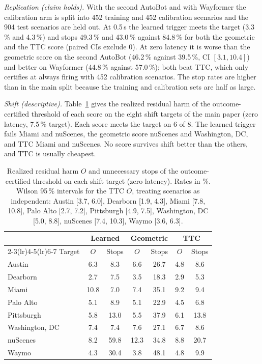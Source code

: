 \documentclass[lettersize,journal]{IEEEtran}
\begin{document}
\emph{Replication (claim holds).} With the second AutoBot and with Wayformer
the calibration arm is split into 452 training and 452 calibration scenarios
and the 904 test scenarios are held out. At 0.5\,s the learned trigger meets
the target (3.3\,\% and 4.3\,\%) and stops 49.3\,\% and 43.0\,\% against 84.8\,\%
for both the geometric and the TTC score (paired CIs exclude 0). At zero
latency it is worse than the geometric score on the second AutoBot (46.2\,\%
against 39.5\,\%, CI $[3.1, 10.4]$) and better on Wayformer (44.8\,\% against
57.0\,\%); both beat TTC, which only certifies at always firing with 452
calibration scenarios. The stop rates are higher than in the main split
because the training and calibration sets are half as large.

\emph{Shift (descriptive).} Table~\ref{tab:scoreshift} gives the realized
residual harm of the outcome-certified threshold of each score on the eight
shift targets of the main paper (zero latency, 7.5\,\% target). Each score
meets the target on 6 of 8. The learned trigger fails Miami and nuScenes, the
geometric score nuScenes and Washington, DC, and TTC Miami and nuScenes. No
score survives shift better than the others, and TTC is usually cheapest.

\begin{table}[h]
\caption{Realized residual harm $O$ and unnecessary stops of the
outcome-certified threshold on each shift target (zero latency). Rates in \%. Wilson 95\,\% intervals for the TTC $O$, treating scenarios as independent: Austin [3.7, 6.0], Dearborn [1.9, 4.3], Miami [7.8, 10.8], Palo Alto [2.7, 7.2], Pittsburgh [4.9, 7.5], Washington, DC [5.0, 8.8], nuScenes [7.4, 10.3], Waymo [3.6, 6.3].}
\label{tab:scoreshift}
\centering
\scriptsize\setlength{\tabcolsep}{2.5pt}
\begin{tabular}{lcccccc}
\toprule
 & \multicolumn{2}{c}{Learned} & \multicolumn{2}{c}{Geometric} & \multicolumn{2}{c}{TTC} \\
\cmidrule(lr){2-3}\cmidrule(lr){4-5}\cmidrule(lr){6-7}
Target & $O$ & Stops & $O$ & Stops & $O$ & Stops \\
\midrule
Austin & 6.3 & 8.3 & 6.6 & 26.7 & 4.8 & 8.6 \\
Dearborn & 2.7 & 7.5 & 3.5 & 18.3 & 2.9 & 5.3 \\
Miami & 10.8 & 7.0 & 7.4 & 35.1 & 9.2 & 9.4 \\
Palo Alto & 5.1 & 8.9 & 5.1 & 22.9 & 4.5 & 6.8 \\
Pittsburgh & 5.8 & 13.0 & 5.5 & 37.9 & 6.1 & 13.8 \\
Washington, DC & 7.4 & 7.4 & 7.6 & 27.1 & 6.7 & 8.6 \\
nuScenes & 8.2 & 59.8 & 12.3 & 34.8 & 8.8 & 20.7 \\
Waymo & 4.3 & 30.4 & 3.8 & 48.1 & 4.8 & 9.9 \\
\bottomrule
\end{tabular}
\end{table}
\end{document}
